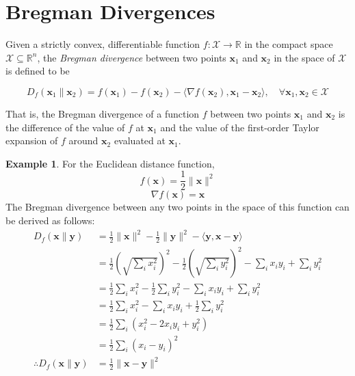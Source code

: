 \documentclass[10pt]{article}
\theoremstyle{definition}
\newtheorem{exmp}{Example}
\begin{document}
\section*{Bregman Divergences}

Given a strictly convex, differentiable function $f:\mathcal{X}\rightarrow \mathbb{R}$ in the compact space $\mathcal{X} \subseteq \mathbb{R}^n$, the \emph{Bregman divergence} between two points $\mathbf{x}_1$ and $\mathbf{x}_2$ in the space of $\mathcal{X}$ is defined to be

\begin{equation}
D_f(\mathbf{x}_1\lVert\mathbf{x}_2) = f(\mathbf{x}_1) - f(\mathbf{x}_2) - \langle\nabla f(\mathbf{x}_2), \mathbf{x}_1 - \mathbf{x}_2\rangle, \quad{} \forall \mathbf{x}_1,\mathbf{x}_2 \in \mathcal{X}
\end{equation}

\noindent
That is, the Bregman divergence of a function $f$ between two points $\mathbf{x}_1$ and $\mathbf{x}_2$ is the difference of the value of $f$ at $\mathbf{x}_1$ and the value of the first-order Taylor expansion of $f$ around $\mathbf{x}_2$ evaluated at $\mathbf{x}_1$.

\begin{exmp}

\noindent
For the Euclidean distance function, 
$$
f(\mathbf{x}) = \frac{1}{2} \lVert \mathbf{x} \rVert ^2
$$
$$
\nabla f(\mathbf{x}) = \mathbf{x}
$$
The Bregman divergence between any two points in the space of this function can be derived as follows:
\begin{equation}
\begin{aligned}
D_f(\mathbf{x}\lVert\mathbf{y}) & = \frac{1}{2} \lVert \mathbf{x} \rVert ^2 - \frac{1}{2} \lVert \mathbf{y} \rVert ^2 - \langle \mathbf{y}, \mathbf{x} - \mathbf{y} \rangle \\
& = \frac{1}{2}\left( \sqrt{\sum_i x_i^2} \right)^2 - \frac{1}{2}\left( \sqrt{\sum_i y_i^2} \right)^2
- \sum_i x_i y_i + \sum_i y_i^2 \\
& = \frac{1}{2}\sum_i x_i^2 - \frac{1}{2}\sum_i y_i^2 - \sum_i x_i y_i + \sum_i y_i^2 \\
& = \frac{1}{2}\sum_i x_i^2 - \sum_i x_i y_i + \frac{1}{2}\sum_i y_i^2 \\
& = \frac{1}{2}\sum_i (x_i^2 - 2 x_i y_i + y_i^2) \\
& = \frac{1}{2}\sum_i (x_i - y_i)^2 \\
\therefore D_f(\mathbf{x}\lVert\mathbf{y}) & = \frac{1}{2} \lVert \mathbf{x} - \mathbf{y} \rVert^2
\end{aligned}
\end{equation}

\end{exmp}
\end{document}
